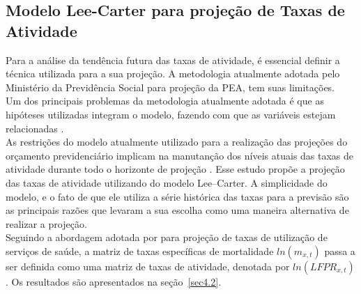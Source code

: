 \documentclass[12pt, 						%
			openright, 					%
			twoside,					%
			a4paper,x					%
			english,					%
			brazil]{abntex2}				%
\begin{document}
		\subsection{Modelo Lee-Carter para projeção de Taxas de Atividade \label{sec3.3.1}}
		Para a análise da tendência futura das taxas de atividade, é essencial definir a técnica utilizada para a sua projeção. A metodologia atualmente adotada pelo Ministério da Previdência Social para projeção da PEA, tem suas limitações. \\
		Um dos principais problemas da metodologia atualmente adotada é que as  hipóteses utilizadas integram o modelo, fazendo com que as variáveis estejam relacionadas \cite{schwarzer2009projeccoes}. \\
		As restrições do modelo atualmente utilizado para a realização das projeções do orçamento previdenciário implicam na manutanção dos níveis atuais das taxas de atividade durante todo o horizonte de projeção \cite{projeccao}. Esse estudo propõe a projeção das taxas de atividade utilizando do modelo Lee--Carter. A simplicidade do modelo, e o fato de que ele utiliza a série histórica das taxas para a previsão são as principais razões que levaram a sua escolha como uma maneira alternativa de realizar a projeção. \\
		Seguindo a abordagem adotada por  para projeção de taxas de utilização de serviços de saúde, a matriz de taxas específicas de mortalidade $ln(m_{x,t})$ passa a ser definida como uma matriz de taxas de atividade, denotada por $ln(LFPR_{x,t})$. Os resultados são apresentados na seção~\ref{sec4.2}.
\end{document}
